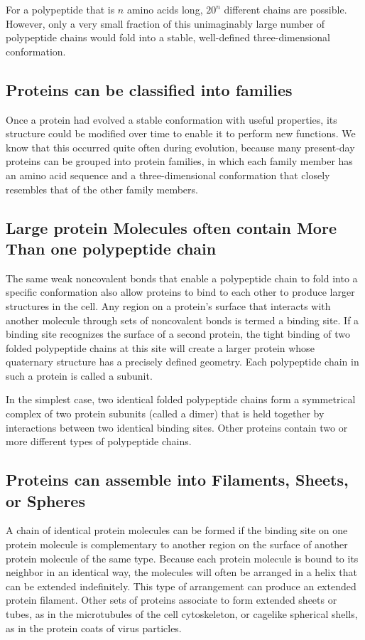 For a polypeptide that is $n$ amino acids long, $20^n$ different chains are possible.
However, only a very small fraction of this unimaginably large number
of polypeptide chains would fold into a stable, well-defined three-dimensional conformation.

\subsection{Proteins can be classified into families}

Once a protein had evolved a stable conformation with useful properties, 
its structure could be modified over time to enable it to perform
new functions. We know that this occurred quite often during evolution,
because many present-day proteins can be grouped into protein families, 
in which each family member has an amino acid sequence and a
three-dimensional conformation that closely resembles that of the other
family members.

\subsection{Large protein Molecules often contain More Than one polypeptide chain}

The same weak noncovalent bonds that enable a polypeptide chain to
fold into a specific conformation also allow proteins to bind to each other
to produce larger structures in the cell. Any region on a protein’s surface
that interacts with another molecule through sets of noncovalent bonds
is termed a binding site.
If a binding site recognizes the surface
of a second protein, the tight binding of two folded polypeptide chains
at this site will create a larger protein whose quaternary structure has a
precisely defined geometry. Each polypeptide chain in such a protein is
called a subunit.

In the simplest case, two identical folded polypeptide chains form a symmetrical
complex of two protein subunits (called a dimer) that is held
together by interactions between two identical binding sites.
Other proteins contain two or more different types of polypeptide chains.

\subsection{Proteins can assemble into Filaments, Sheets, or Spheres}

A chain of identical protein molecules can be formed if the
binding site on one protein molecule is complementary to another region
on the surface of another protein molecule of the same type. Because
each protein molecule is bound to its neighbor in an identical way, the
molecules will often be arranged in a helix that can be extended indefinitely. 
This type of arrangement can produce an extended protein filament.
Other sets of proteins associate to form extended sheets or tubes, 
as in the microtubules of the cell cytoskeleton, or cagelike spherical shells,
as in the protein coats of virus particles.

